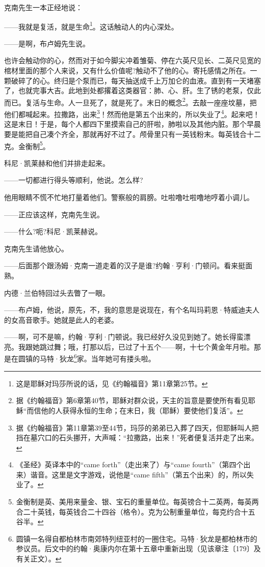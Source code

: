 \par 克南先生一本正经地说：
\par ——我就是复活，就是生命\footnote{这是耶稣对玛莎所说的话，见《约翰福音》第11章第25节。}。这话触动人的内心深处。
\par ——是啊，布卢姆先生说。
\par 也许会触动你的心，然而对于如今脚尖冲着雏菊、停在六英尺见长、二英尺见宽的棺材里面的那个人来说，又有什么价值呢?触动不了他的心。寄托感情之所在。一颗破碎了的心。终归是个泵而已，每天抽送成千上万加仑的血液。直到有一天堵塞了，也就完事大吉。此地到处都撂着这类器官：肺、心、肝。生了锈的老泵，仅此而已。复活与生命。人一旦死了，就是死了。末日的概念\footnote{据《约翰福音》第6章第40节，耶稣对群众说，天主的旨意是要使所有看见耶稣“而信他的人获得永恒的生命；在末日，我（耶稣）要使他们复活”。}。去敲一座座坟墓，把他们都喊起来。拉撒路，出来\footnote{据《约翰福音》第11章第39至44节，玛莎的弟弟已入葬了四天，但耶稣叫人把挡在墓穴口的石头挪开，大声喊：“拉撒路，出来！”死者便复活并走了出来。}！然而他是第五个出来的，所以失业了\footnote{《圣经》英译本中的“came forth”（走出来了）与“came fourth”（第四个出来）谐音。这里是文字游戏，说他是“came fifth”（第五个出来）的，所以失业了。}。起来吧！这是末日！于是，每个人都四下里摸索自己的肝啦，肺啦以及其他内脏。那个早晨要是能把自己凑个齐全，那就再好不过了。颅骨里只有一英钱粉末。每英钱合十二克。金衡制\footnote{金衡制是英、美用来量金、银、宝石的重量单位。每英镑合十二英两，每英两合二十英钱，每英钱合二十四谷（格令）。克为公制重量单位，每克约合十五谷半。}。
\par 科尼·凯莱赫和他们并排走起来。
\par ——一切都进行得头等顺利，他说。怎么样?
\par 他用眼睛不慌不忙地打量着他们。警察般的肩膀。吐啦噜吐啦噜地哼着小调儿。
\par ——正应该这样，克南先生说。
\par ——什么?呃?科尼·凯莱赫说。
\par 克南先生请他放心。
\par ——后面那个跟汤姆·克南一道走着的汉子是谁?约翰·亨利·门顿问。看来挺面熟。
\par 内德·兰伯特回过头去瞥了一眼。
\par ——布卢姆，他说，原先，不，我的意思是说现在，有个名叫玛莉恩·特威迪夫人的女高音歌手。她就是此人的老婆。
\par ——啊，可不是嘛，约翰·亨利·门顿说。我已经好久没见到她了。她长得蛮漂亮。我跟她跳过舞；哦，打那以后，已过了十五个——啊，十七个黄金年月啦。那是在圆镇的马特·狄龙\footnote{圆镇一名得自都柏林市南郊特列纽亚村的一圈住宅。马特·狄龙是都柏林市的参议员。后文中的约翰·奥康内尔在第十五章中重新出现（见该章注〔179〕及有关正文）。}家。当年她可有搂头啦。
